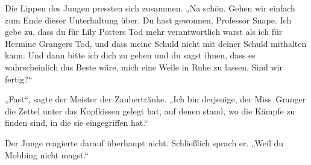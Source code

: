 Die Lippen des Jungen pressten sich zusammen.
„Na schön. Gehen wir einfach zum Ende dieser Unterhaltung über. Du hast gewonnen, Professor Snape. Ich gebe zu, dass du für Lily Potters Tod mehr verantwortlich warst als ich für Hermine Grangers Tod, und dass meine Schuld nicht mit deiner Schuld mithalten kann. Und dann bitte ich dich zu gehen und du sagst ihnen, dass es wahrscheinlich das Beste wäre, mich eine Weile in Ruhe zu lassen. Sind wir fertig?“

„Fast“, sagte der Meister der Zaubertränke. „Ich bin derjenige, der Miss~Granger die Zettel unter das Kopfkissen gelegt hat, auf denen stand, wo die Kämpfe zu finden sind, in die sie eingegriffen hat.“

Der Junge reagierte darauf überhaupt nicht.
Schließlich sprach er.
„Weil du Mobbing nicht magst.“


